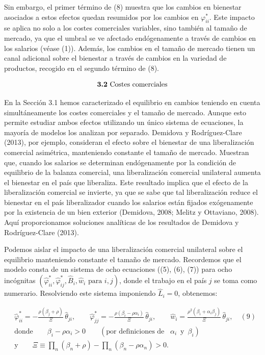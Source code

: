 \documentclass[10pt,a4paper]{article}
\begin{document}
Sin embargo, el primer término de (8) muestra que los cambios en bienestar asociados a estos efectos quedan resumidos por los cambios en $\varphi_{ii}^*$. Este impacto se aplica no solo a los costes comerciales variables, sino también al tamaño de mercado, ya que el umbral se ve afectado endógenamente a través de cambios en los salarios (véase (1)). Además, los cambios en el tamaño de mercado tienen un canal adicional sobre el bienestar a través de cambios en la variedad de productos, recogido en el segundo término de (8).

$$\text{\textbf{3.2} Costes comerciales}$$

En la Sección 3.1 hemos caracterizado el equilibrio en cambios teniendo en cuenta simultáneamente los costes comerciales y el tamaño de mercado. Aunque esto permite estudiar ambos efectos utilizando un único sistema de ecuaciones, la mayoría de modelos los analizan por separado. Demidova y Rodríguez-Clare (2013), por ejemplo, consideran el efecto sobre el bienestar de una liberalización comercial asimétrica, manteniendo constante el tamaño de mercado. Muestran que, cuando los salarios se determinan endógenamente por la condición de equilibrio de la balanza comercial, una liberalización comercial unilateral aumenta el bienestar en el país que liberaliza. Este resultado implica que el efecto de la liberalización comercial se invierte, ya que se sabe que tal liberalización reduce el bienestar en el país liberalizador cuando los salarios están fijados exógenamente por la existencia de un bien exterior (Demidova, 2008; Melitz y Ottaviano, 2008). Aquí proporcionamos soluciones analíticas de los resultados de Demidova y Rodríguez-Clare (2013).

Podemos aislar el impacto de una liberalización comercial unilateral sobre el equilibrio manteniendo constante el tamaño de mercado. Recordemos que el modelo consta de un sistema de ocho ecuaciones ((5), (6), (7)) para ocho incógnitas $(\hat{\varphi}_{ii}^*, \hat{\varphi}_{ij}^*, \hat{B}_i, \hat{w}_i \text{ para } i,j)$, donde el trabajo en el país $j$ se toma como numerario. Resolviendo este sistema imponiendo $\hat{L}_i = 0$, obtenemos:

$$\begin{aligned}
    &\hat{\varphi}_{ii}^* =-\frac{\rho(\beta_j+\rho)}{\Xi}\,\hat{\theta}_{ji},\qquad\hat{\varphi}_{jj}^* =-\frac{\rho(\beta_i-\rho \alpha_i)}{\Xi}\,\hat{\theta}_{ji},\qquad\hat{w}_i =\frac{\rho^2(\beta_i+\alpha_i\beta_j)}{\Xi}\,\hat{\theta}_{ji}, \quad (9)\\[2em]
    &\text{donde}\qquad \beta_i - \rho \alpha_i > 0\qquad  (\text{por definiciones de }\,\,\,  \alpha_i\,\,\,  \text{y}\,\,\,  \beta_i)\\[1em]
    &\text{y}\qquad  \Xi \equiv \prod_n (\beta_n+\rho) - \prod_n (\beta_n-\rho\alpha_n) > 0.
\end{aligned}$$
\end{document}
